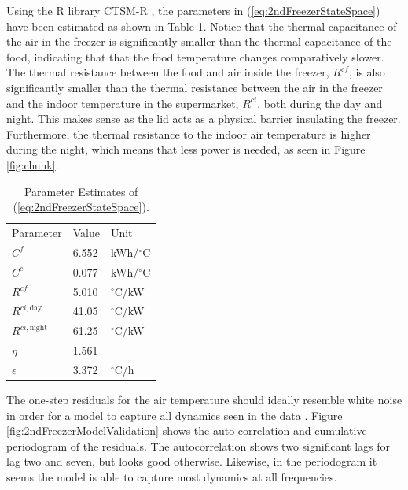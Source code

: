 Using the R library CTSM-R \cite{juhl2016ctsmr}, the parameters in (\ref{eq:2ndFreezerStateSpace}) have been estimated as shown in Table \ref{tab:parameter_estimates}. Notice that the thermal capacitance of the air in the freezer is significantly smaller than the thermal capacitance of the food, indicating that that the food temperature changes comparatively slower. The thermal resistance between the food and air inside the freezer, $R^{cf}$, is also significantly smaller than the thermal resistance between the air in the freezer and the indoor temperature in the supermarket, $R^{ci}$, both during the day and night. This makes sense as the lid acts as a physical barrier insulating the freezer. Furthermore, the thermal resistance to the indoor air temperature is higher during the night, which means that less power is needed, as seen in Figure \ref{fig:chunk}.

\begin{table}[!t]
    \caption{Parameter Estimates of (\ref{eq:2ndFreezerStateSpace}).}
    \label{tab:parameter_estimates}
    \centering
    \begin{tabular}[b]{|l|l|l|}
        \hline
        Parameter       & Value & Unit            \\ \hhline{|=|=|=|}
        $C^f$           & 6.552  & kWh/$^{\circ}$C \\
        $C^c$           & 0.077  & kWh/$^{\circ}$C \\
        $R^{cf}$        & 5.010  & $^{\circ}$C/kW  \\
        $R^{ci, \text{day}}$   & 41.05  & $^{\circ}$C/kW  \\
        $R^{ci, \text{night}}$ & 61.25  & $^{\circ}$C/kW  \\
        $\eta$          & 1.561  &                 \\
        $\epsilon$      & 3.372 & $^{\circ}$C/h   \\ \hline
    \end{tabular}
\end{table}


The one-step residuals for the air temperature should ideally resemble white noise in order for a model to capture all dynamics seen in the data \cite{madsen2007time}. Figure \ref{fig:2ndFreezerModelValidation} shows the auto-correlation and cumulative periodogram of the residuals. The autocorrelation shows two significant lags for lag two and seven, but looks good otherwise. Likewise, in the periodogram it seems the model is able to capture most dynamics at all frequencies. 

